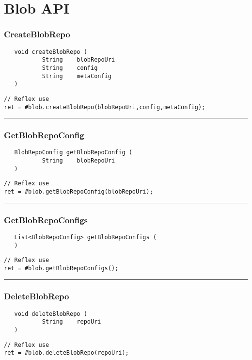 \section{Blob API}

\subsubsection{CreateBlobRepo}
\label{Api:CreateBlobRepo}
\begin{verbatim}
   void createBlobRepo (
           String    blobRepoUri
           String    config
           String    metaConfig
   )
\end{verbatim}
\begin{lstlisting}[language=reflex]
// Reflex use
ret = #blob.createBlobRepo(blobRepoUri,config,metaConfig);
\end{lstlisting}



\rule{15cm}{2pt}
\subsubsection{GetBlobRepoConfig}
\label{Api:GetBlobRepoConfig}
\begin{verbatim}
   BlobRepoConfig getBlobRepoConfig (
           String    blobRepoUri
   )
\end{verbatim}
\begin{lstlisting}[language=reflex]
// Reflex use
ret = #blob.getBlobRepoConfig(blobRepoUri);
\end{lstlisting}



\rule{15cm}{2pt}
\subsubsection{GetBlobRepoConfigs}
\label{Api:GetBlobRepoConfigs}
\begin{verbatim}
   List<BlobRepoConfig> getBlobRepoConfigs (
   )
\end{verbatim}
\begin{lstlisting}[language=reflex]
// Reflex use
ret = #blob.getBlobRepoConfigs();
\end{lstlisting}



\rule{15cm}{2pt}
\subsubsection{DeleteBlobRepo}
\label{Api:DeleteBlobRepo}
\begin{verbatim}
   void deleteBlobRepo (
           String    repoUri
   )
\end{verbatim}
\begin{lstlisting}[language=reflex]
// Reflex use
ret = #blob.deleteBlobRepo(repoUri);
\end{lstlisting}




